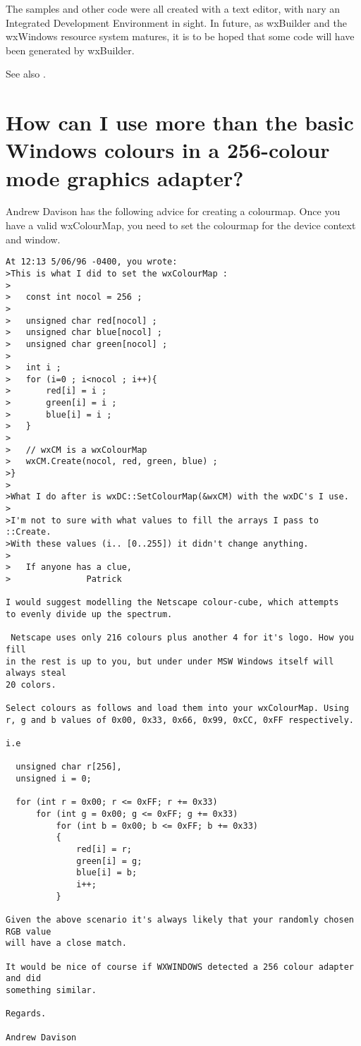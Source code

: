 The samples and other code were all created with a text editor, with nary
an Integrated Development Environment in sight. In future, as
wxBuilder and the wxWindows resource system matures, it is to be hoped
that some code will have been generated by wxBuilder.

See also .

\section{How can I use more than the basic Windows colours in a 256-colour mode graphics adapter?}

Andrew Davison has the following advice for creating a colourmap. Once you have a valid wxColourMap,
you need to set the colourmap for the device context and window.

\begin{verbatim}
At 12:13 5/06/96 -0400, you wrote:
>This is what I did to set the wxColourMap :
>
>	const int nocol = 256 ;
>
>	unsigned char red[nocol] ;
>	unsigned char blue[nocol] ;
>	unsigned char green[nocol] ;
>
>	int i ;
>	for (i=0 ; i<nocol ; i++){
>		red[i] = i ;
>		green[i] = i ;
>		blue[i] = i ;
>	}
>
>	// wxCM is a wxColourMap
>	wxCM.Create(nocol, red, green, blue) ;
>}
>
>What I do after is wxDC::SetColourMap(&wxCM) with the wxDC's I use.   
>
>I'm not to sure with what values to fill the arrays I pass to ::Create.
>With these values (i.. [0..255]) it didn't change anything.
>
>	If anyone has a clue,
>				Patrick

I would suggest modelling the Netscape colour-cube, which attempts
to evenly divide up the spectrum. 

 Netscape uses only 216 colours plus another 4 for it's logo. How you fill
in the rest is up to you, but under under MSW Windows itself will always steal
20 colors.

Select colours as follows and load them into your wxColourMap. Using
r, g and b values of 0x00, 0x33, 0x66, 0x99, 0xCC, 0xFF respectively.

i.e

  unsigned char r[256], 
  unsigned i = 0;

  for (int r = 0x00; r <= 0xFF; r += 0x33)
      for (int g = 0x00; g <= 0xFF; g += 0x33)
          for (int b = 0x00; b <= 0xFF; b += 0x33)
          {
              red[i] = r;
              green[i] = g;
              blue[i] = b;
              i++;
          }

Given the above scenario it's always likely that your randomly chosen RGB value
will have a close match.

It would be nice of course if WXWINDOWS detected a 256 colour adapter and did
something similar.

Regards.

Andrew Davison
\end{verbatim}

